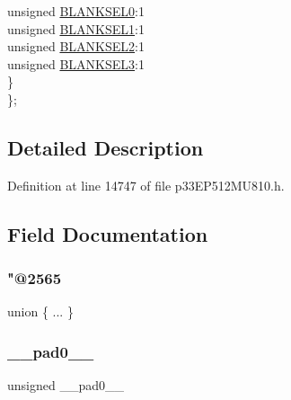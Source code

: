 \begin{DoxyCompactItemize}
\begin{tabbing}
\>\>unsigned \hyperlink{structtag_a_u_x_c_o_n3_b_i_t_s_ac11d96c4da7a19f8070237598aad5779}{BLANKSEL0}:1\\
\>\>unsigned \hyperlink{structtag_a_u_x_c_o_n3_b_i_t_s_a44677be7697055968c0df4a017937ad4}{BLANKSEL1}:1\\
\>\>unsigned \hyperlink{structtag_a_u_x_c_o_n3_b_i_t_s_aded93be63f6e5d719aa8cd84f125f650}{BLANKSEL2}:1\\
\>\>unsigned \hyperlink{structtag_a_u_x_c_o_n3_b_i_t_s_a9a435fdd957a6f0e1b6e67ea964df687}{BLANKSEL3}:1\\
\>\} \\
\}; \\

\end{tabbing}\end{DoxyCompactItemize}


\subsection{Detailed Description}


Definition at line 14747 of file p33\+E\+P512\+M\+U810.\+h.



\subsection{Field Documentation}
\mbox{\label{structtag_a_u_x_c_o_n3_b_i_t_s_af357013f983b993489ff702b33e47c5c}} 
\subsubsection{\texorpdfstring{"@2565}{@2565}}
{\footnotesize\ttfamily union \{ ... \} }

\mbox{\label{structtag_a_u_x_c_o_n3_b_i_t_s_adf71f3d8410c1f1dbbc96680a92c49af}} 
\subsubsection{\texorpdfstring{\+\_\+\+\_\+pad0\+\_\+\+\_\+}{\_\_pad0\_\_}}
{\footnotesize\ttfamily unsigned \+\_\+\+\_\+pad0\+\_\+\+\_\+}



